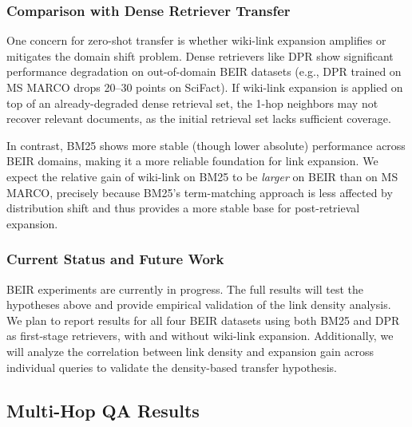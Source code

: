 \documentclass[sigconf,review]{acmart}
\begin{document}
\subsubsection{Comparison with Dense Retriever Transfer}
One concern for zero-shot transfer is whether wiki-link expansion
amplifies or mitigates the domain shift problem. Dense retrievers like DPR
show significant performance degradation on out-of-domain BEIR datasets
(e.g., DPR trained on MS MARCO drops 20--30 points on SciFact). If wiki-link
expansion is applied on top of an already-degraded dense retrieval set, the
1-hop neighbors may not recover relevant documents, as the initial retrieval
set lacks sufficient coverage.

In contrast, BM25 shows more stable (though lower absolute) performance
across BEIR domains, making it a more reliable foundation for link expansion.
We expect the relative gain of wiki-link on BM25 to be \emph{larger} on BEIR
than on MS MARCO, precisely because BM25's term-matching approach is less
affected by distribution shift and thus provides a more stable base for
post-retrieval expansion.

\subsubsection{Current Status and Future Work}
BEIR experiments are currently in progress. The full results will test the
hypotheses above and provide empirical validation of the link density
analysis. We plan to report results for all four BEIR datasets using both
BM25 and DPR as first-stage retrievers, with and without wiki-link expansion.
Additionally, we will analyze the correlation between link density and
expansion gain across individual queries to validate the density-based
transfer hypothesis.

\subsection{Multi-Hop QA Results}
\label{sec:multihop}
\end{document}
